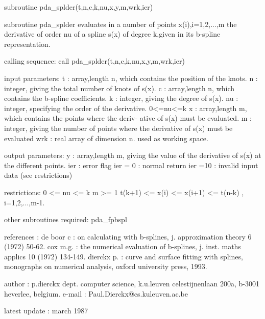 \documentclass[11pt,twoside,nolof]{starlink}
\begin{document}
\begin{terminalv}
      subroutine pda_splder(t,n,c,k,nu,x,y,m,wrk,ier)


  subroutine pda_splder evaluates in a number of points x(i),i=1,2,...,m
  the derivative of order nu of a spline s(x) of degree k,given in
  its b-spline representation.

  calling sequence:
     call pda_splder(t,n,c,k,nu,x,y,m,wrk,ier)

  input parameters:
    t    : array,length n, which contains the position of the knots.
    n    : integer, giving the total number of knots of s(x).
    c    : array,length n, which contains the b-spline coefficients.
    k    : integer, giving the degree of s(x).
    nu   : integer, specifying the order of the derivative. 0<=nu<=k
    x    : array,length m, which contains the points where the deriv-
           ative of s(x) must be evaluated.
    m    : integer, giving the number of points where the derivative
           of s(x) must be evaluated
    wrk  : real array of dimension n. used as working space.

  output parameters:
    y    : array,length m, giving the value of the derivative of s(x)
           at the different points.
    ier  : error flag
      ier = 0 : normal return
      ier =10 : invalid input data (see restrictions)

  restrictions:
    0 <= nu <= k
    m >= 1
    t(k+1) <= x(i) <= x(i+1) <= t(n-k) , i=1,2,...,m-1.

  other subroutines required: pda_fpbspl

  references :
    de boor c : on calculating with b-splines, j. approximation theory
                6 (1972) 50-62.
    cox m.g.  : the numerical evaluation of b-splines, j. inst. maths
                applics 10 (1972) 134-149.
   dierckx p. : curve and surface fitting with splines, monographs on
                numerical analysis, oxford university press, 1993.

  author :
    p.dierckx
    dept. computer science, k.u.leuven
    celestijnenlaan 200a, b-3001 heverlee, belgium.
    e-mail : Paul.Dierckx@cs.kuleuven.ac.be

  latest update : march 1987
\end{terminalv}


\end{document}
